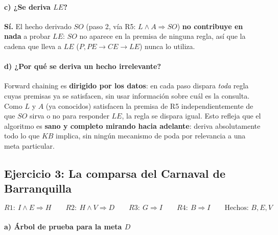 \paragraph{c) ¿Se deriva $LE$?}
\textbf{Sí.} El hecho derivado $SO$ (paso 2, vía R5: $L\land A\Rightarrow SO$) \textbf{no contribuye
en nada} a probar $LE$: $SO$ no aparece en la premisa de ninguna regla, así que la cadena que lleva a
$LE$ ($P,PE\to CE\to LE$) nunca lo utiliza.

\paragraph{d) ¿Por qué se deriva un hecho irrelevante?}
Forward chaining es \textbf{dirigido por los datos}: en cada paso dispara \emph{toda} regla cuyas
premisas ya se satisfacen, sin usar información sobre cuál es la consulta. Como $L$ y $A$ (ya
conocidos) satisfacen la premisa de R5 independientemente de que $SO$ sirva o no para responder
$LE$, la regla se dispara igual. Esto refleja que el algoritmo es \textbf{sano y completo mirando
hacia adelante}: deriva absolutamente todo lo que $KB$ implica, sin ningún mecanismo de poda por
relevancia a una meta particular.

\subsection{Ejercicio 3: La comparsa del Carnaval de Barranquilla}

\[
    R1:\ I\land E\Rightarrow H \qquad R2:\ H\land V\Rightarrow D \qquad R3:\ G\Rightarrow I \qquad
    R4:\ B\Rightarrow I \qquad \text{Hechos: } B,E,V
\]

\paragraph{a) Árbol de prueba para la meta $D$}

